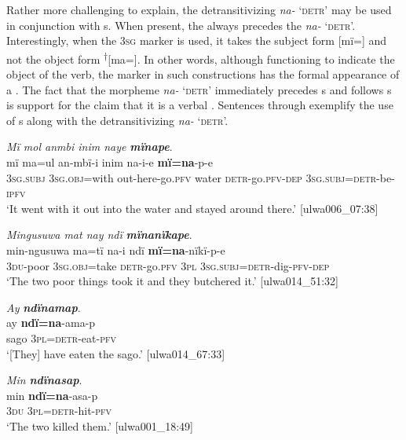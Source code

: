 Rather more challenging to explain, the detransitivizing  \textit{na-} ‘\textsc{detr}’ may be used in conjunction with  s. When present, the  always precedes the  \textit{na-} ‘\textsc{detr}’. Interestingly, when the 3\textsc{sg} marker is used, it takes the subject form [mï=] and not the object form \textsuperscript{†}[ma=]. In other words, although functioning to indicate the object of the verb, the marker in such constructions has the formal appearance of a . The fact that the morpheme \textit{na-} ‘\textsc{detr}’ immediately precedes s and follows  s is support for the claim that it is a verbal . Sentences  through  exemplify the use of s along with the detransitivizing  \textit{na-} `\textsc{detr}’.

\ea%
    \label{ex:syntax:329}
          \textit{Mï mol anmbi inim naye} \textbf{\textit{mïnape}}.\\
\gll mï      ma=ul      an-mbï-i      inim  na-i-e \textbf{mï=na}{}-p-e\\
    3\textsc{sg.subj}  3\textsc{sg.obj}=with  out-here-go.\textsc{pfv}  water  \textsc{detr}{}-go.\textsc{pfv-dep}    3\textsc{sg.subj=detr}{}-be\textsc{{}-ipfv}\\
\glt `It went with it out into the water and stayed around there.’ [ulwa006\_07:38]
\z

\ea%
    \label{ex:syntax:330}
          \textit{Mingusuwa mat nay ndï} \textbf{\textit{mïnanïkape}}.\\
\gll min-ngusuwa  ma=tï      na-i      ndï \textbf{mï=na}{}-nïkï-p-e\\
    3\textsc{du-}poor    3\textsc{sg.obj}=take  \textsc{detr}{}-go.\textsc{pfv}  \textsc{3pl}    3\textsc{sg.subj}=\textsc{detr}{}-dig{}-\textsc{pfv-dep}\\
\glt `The two poor things took it and they butchered it.’ [ulwa014\_51:32]
\z

\ea%
    \label{ex:syntax:331}
          \textit{Ay} \textbf{\textit{ndïnamap}}.\\
\gll ay    \textbf{ndï=na}{}-ama-p\\
    sago  3\textsc{pl}=\textsc{detr}{}-eat-\textsc{pfv}\\
\glt `[They] have eaten the sago.’ [ulwa014\_67:33]
\z

\ea%
    \label{ex:syntax:332}
          \textit{Min} \textbf{\textit{ndïnasap}}.\\
\gll min  \textbf{ndï=na}{}-asa-p\\
    3\textsc{du}  3\textsc{pl}=\textsc{detr}{}-hit{}-\textsc{pfv}\\
\glt `The two killed them.’ [ulwa001\_18:49]
\z

